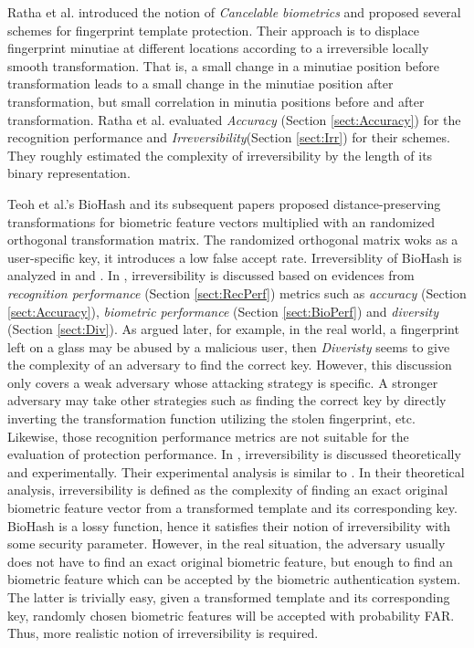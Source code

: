 Ratha et al. \cite{Ratha:2001gu} introduced the notion of {\it Cancelable biometrics} and proposed several schemes for fingerprint template protection\cite{Ratha:2007it}. Their approach is to displace fingerprint minutiae at different locations according to a irreversible locally smooth transformation. That is, a small change in a minutiae position before transformation leads to a small change in the minutiae position after transformation, but small correlation in minutia positions before and after transformation. Ratha et al.\cite{Ratha:2007it}  evaluated {\it Accuracy} (Section \ref{sect:Accuracy}) for the recognition performance and {\it Irreversibility}(Section \ref{sect:Irr}) for their schemes. They roughly estimated the complexity of irreversibility by the length of its binary representation.

Teoh et al.'s BioHash\cite{Jin:2004kc} and its subsequent papers\cite{Connie:2005wg,Teoh:2006kr,Teoh:2007dd} proposed distance-preserving transformations for biometric feature vectors multiplied with an randomized orthogonal transformation matrix. The randomized orthogonal matrix woks as a user-specific key, it introduces a low false accept rate. Irreversiblity of BioHash is analyzed in \cite{Jin:2004kc} and \cite{Kuan:2005ut}. In \cite{Jin:2004kc}, irreversibility is discussed based on evidences from {\it recognition performance} (Section \ref{sect:RecPerf}) metrics such as {\it accuracy} (Section \ref{sect:Accuracy}), {\it biometric performance} (Section \ref{sect:BioPerf}) and {\it diversity} (Section \ref{sect:Div}). As argued later, for example, in the real world, a fingerprint left on a glass may be abused by a malicious user, then {\it Diveristy} seems to give the complexity of an adversary to find the correct key. However, this discussion only covers a weak adversary whose attacking strategy is specific. A stronger adversary may take other strategies such as finding the correct key by directly inverting the transformation function utilizing the stolen fingerprint, etc. Likewise, those recognition performance metrics are not suitable for the evaluation of protection performance. In \cite{Kuan:2005ut}, irreversibility is discussed theoretically and experimentally. Their experimental analysis is similar to  \cite{Jin:2004kc}. In their theoretical analysis, irreversibility is defined as the complexity of finding an exact original biometric feature vector from a transformed template and its corresponding key. BioHash is a lossy function, hence it satisfies their notion of irreversibility with some security parameter. However, in the real situation, the adversary usually does not have to find an exact original biometric feature, but enough to find an biometric feature which can be accepted by the biometric authentication system. The latter is trivially easy, given a transformed template and its corresponding key, randomly chosen biometric features will be accepted with probability FAR. Thus, more realistic notion of irreversibility is required.

